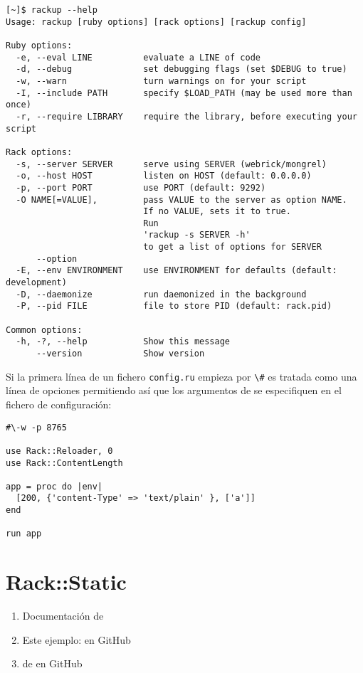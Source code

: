 \begin{verbatim}
[~]$ rackup --help
Usage: rackup [ruby options] [rack options] [rackup config]

Ruby options:
  -e, --eval LINE          evaluate a LINE of code
  -d, --debug              set debugging flags (set $DEBUG to true)
  -w, --warn               turn warnings on for your script
  -I, --include PATH       specify $LOAD_PATH (may be used more than once)
  -r, --require LIBRARY    require the library, before executing your script

Rack options:
  -s, --server SERVER      serve using SERVER (webrick/mongrel)
  -o, --host HOST          listen on HOST (default: 0.0.0.0)
  -p, --port PORT          use PORT (default: 9292)
  -O NAME[=VALUE],         pass VALUE to the server as option NAME. 
                           If no VALUE, sets it to true. 
                           Run 
                           'rackup -s SERVER -h' 
                           to get a list of options for SERVER
      --option
  -E, --env ENVIRONMENT    use ENVIRONMENT for defaults (default: development)
  -D, --daemonize          run daemonized in the background
  -P, --pid FILE           file to store PID (default: rack.pid)

Common options:
  -h, -?, --help           Show this message
      --version            Show version
\end{verbatim}

Si la primera línea de un fichero \verb|config.ru| empieza por \verb|\#| es tratada 
como una línea de opciones permitiendo así que los argumentos de 
se especifiquen en el fichero de configuración:

\begin{verbatim}
#\-w -p 8765

use Rack::Reloader, 0
use Rack::ContentLength

app = proc do |env|
  [200, {'content-Type' => 'text/plain' }, ['a']]
end

run app
\end{verbatim}

\section{Rack::Static}


\begin{enumerate}
\item Documentación de \rackstatic{} 
\item  Este ejemplo: 
en GitHub
\item 
{}
de \rackstatic{} en GitHub
\end{enumerate}

